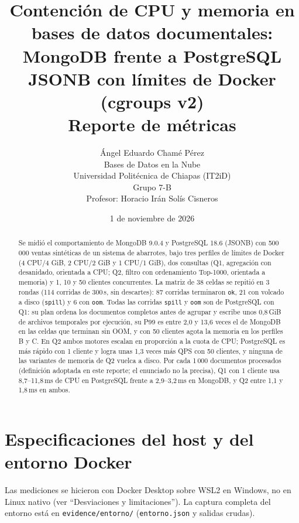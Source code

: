 \documentclass[11pt,a4paper]{article}
\title{Contención de CPU y memoria en bases de datos documentales:\\
MongoDB frente a PostgreSQL JSONB con límites de Docker (cgroups v2)\\[4pt]
\large Reporte de métricas}
\author{Ángel Eduardo Chamé Pérez \\[2pt]
\small Bases de Datos en la Nube \\
\small Universidad Politécnica de Chiapas (IT2iD) \\
\small Grupo 7-B \\
\small Profesor: Horacio Irán Solís Cisneros}
\date{1 de noviembre de 2026}
\newcommand{\cod}[1]{\texttt{#1}}
\begin{document}
\maketitle

\begin{abstract}
\noindent Se midió el comportamiento de MongoDB 9.0.4 y PostgreSQL 18.6 (JSONB) con
500\,000 ventas sintéticas de un sistema de abarrotes, bajo tres perfiles de límites de
Docker (4 CPU/4 GiB, 2 CPU/2 GiB y 1 CPU/1 GiB), dos consultas (Q1, agregación con
desanidado, orientada a CPU; Q2, filtro con ordenamiento Top-1000, orientada a memoria) y
1, 10 y 50 clientes concurrentes. La matriz de 38 celdas se repitió en 3 rondas
(114 corridas de 300\,s, sin descartes): 87 corridas terminaron \cod{ok}, 21 con
volcado a disco (\cod{spill}) y 6 con \cod{oom}. Todas las corridas \cod{spill} y
\cod{oom} son de PostgreSQL con Q1: su plan ordena los documentos completos antes de
agrupar y escribe unos 0,8\,GiB de archivos temporales por ejecución, su P99 es entre
2,0 y 13,6 veces el de MongoDB en las celdas que terminan sin OOM, y con 50 clientes
agota la memoria en los perfiles B y C. En Q2 ambos motores escalan en proporción a la
cuota de CPU; PostgreSQL es más rápido con 1 cliente y logra unas 1,3 veces más
QPS con 50 clientes, y ninguna de las variantes de memoria de Q2 vuelca a disco. Por cada
1\,000 documentos procesados (definición adoptada en este reporte; el enunciado no la
precisa), Q1 con 1 cliente usa 8,7--11,8\,ms de
CPU en PostgreSQL frente a 2,9--3,2\,ms en MongoDB, y Q2 entre 1,1 y 1,8\,ms en ambos.
\end{abstract}

\tableofcontents
\clearpage

\section{Especificaciones del host y del entorno Docker}
Las mediciones se hicieron con Docker Desktop sobre WSL2 en Windows, no en Linux nativo
(ver ``Desviaciones y limitaciones''). La captura completa del entorno está en
\cod{evidence/entorno/} (\cod{entorno.json} y salidas crudas).
\end{document}
